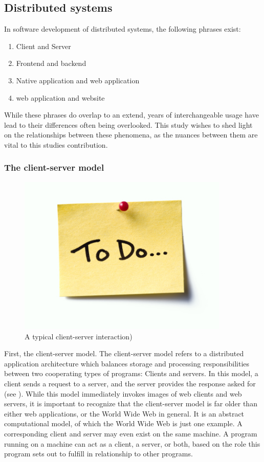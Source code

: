 \subsection{Distributed systems}
\label{sec:background-web-terminology}

In software development of distributed systems, the following phrases exist: 
\begin{enumerate}[-]
  \item Client and Server 
  \item Frontend and backend
  \item Native application and web application
  \item web application and website
\end{enumerate}
While these phrases do overlap to an extend, years of interchangeable usage have lead to their differences often being overlooked. 
This study wishes to shed light on the relationships between these phenomena, as the nuances between them are vital to this studies contribution.

\subsubsection*{The client-server model}

\begin{figure}
  \centering
  \graphicspath{ {../../assets/images/misc/} }
  \includegraphics[width=380px]{todo.jpg}
  \caption{A typical client-server interaction) }
  \label{fig:client-server}
\end{figure}

First, the client-server model. 
The client-server model refers to a distributed application architecture which balances storage and processing responsibilities between two cooperating types of programs: 
Clients and servers.
In this model, a client sends a request to a server, and the server provides the response asked for (see ).
While this model immediately invokes images of web clients and web servers, it is important to recognize that the client-server model is far older than either web applications, or the World Wide Web in general. 
It is an abstract computational model, of which the World Wide Web is just one example.
A corresponding client and server may even exist on the same machine. 
A program running on a machine can act as a client, a server, or both, based on the role this program sets out to fulfill in relationship to other programs. 

